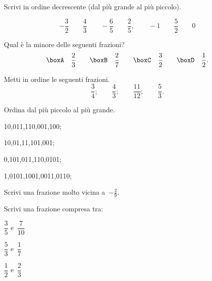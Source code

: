 \begin{esercizio}
 \label{ese:3.33}
Scrivi in ordine decrescente (dal più grande al più piccolo).

\[-\frac{3}{2} \qquad \frac{4}{3} \qquad -\frac{6}{5} \qquad \frac{2}{5},
\qquad-1 \qquad \frac{5}{2} \qquad 0\]
\end{esercizio}

 \begin{esercizio}
\label{ese:3.34}
Qual è la minore delle seguenti frazioni?
\[\boxA\quad\frac{2}{3}\qquad
\boxB\quad\frac{2}{7}\qquad
\boxC\quad\frac{3}{2}\qquad
\boxD\quad\frac{1}{2}.\]
\end{esercizio}

\begin{esercizio}
\label{ese:3.35}
Metti in ordine le seguenti frazioni.
\[\frac{3}{4};\qquad\frac{4}{3};\qquad\frac{11}{12};\qquad\frac{5}{3}.\]
\end{esercizio}

\begin{esercizio}
 \label{ese:3.36}
Ordina dal più piccolo al più grande.
\begin{enumeratea}
\item 10,011,110,001,100;
\item 10,01,11,101,001;
\item 0,101,011,110,0101;
\item 1,0101,1001,0011,0110;
\end{enumeratea}
\end{esercizio}

\begin{esercizio}
\label{ese:3.37}
Scrivi una frazione molto vicina a~\(-\frac{2}{9}.\)
\end{esercizio}

\begin{esercizio}
\label{ese:3.38}
Scrivi una frazione compresa tra:
\begin{multicols}{3}
\begin{enumeratea}
\item \(\dfrac{3}{5}\) e~\(\dfrac{7}{10}\)
\item \(\dfrac{5}{3}\) e~\(\dfrac{1}{7}\)
\item \(\dfrac{1}{2}\) e~\(\dfrac{2}{3}\)
\end{enumeratea}
\end{multicols}
\end{esercizio}

